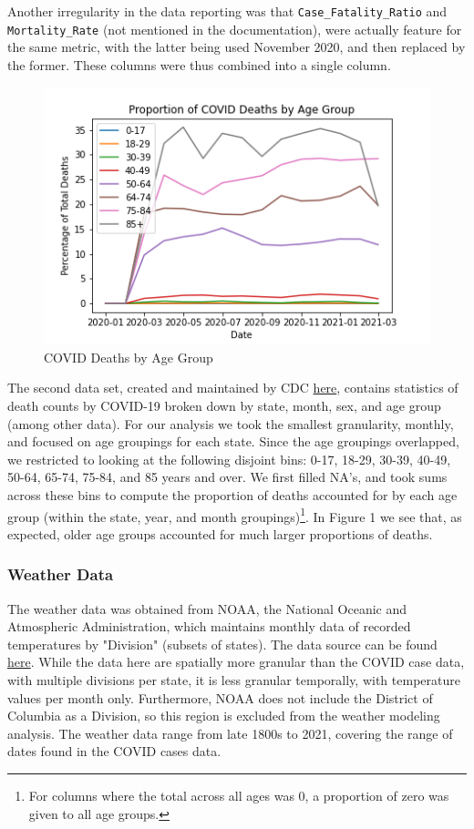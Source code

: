 \documentclass[11pt]{article}
\begin{document}
Another irregularity in the data reporting was that \texttt{Case\_Fatality\_Ratio} and \texttt{Mortality\_Rate} (not mentioned in the documentation), were actually feature for the same metric, with the latter being used November 2020, and then replaced by the former. These columns were thus combined into a single column.


\begin{figure}
\centering
\includegraphics[scale=0.55]{"../figures/death_proportions_by_age.png"}
\caption{COVID Deaths by Age Group}
\end{figure}
The second data set, created and maintained by CDC \href{https://data.cdc.gov/NCHS/Provisional-COVID-19-Deaths-by-Sex-and-Age/9bhg-hcku}{here}, contains statistics of death counts by COVID-19 broken down by state, month, sex, and age group (among other data). For our analysis we took the smallest granularity, monthly, and focused on age groupings for each state. Since the age groupings overlapped, we restricted to looking at the following disjoint bins:  0-17,  18-29, 30-39, 40-49, 50-64, 65-74, 75-84, and 85 years and over. We first filled NA's, and took sums across these bins to compute the proportion of deaths accounted for by each age group (within the state, year, and month groupings)\footnote{For columns where the total across all ages was 0, a proportion of zero was given to all age groups.}.  In Figure 1 we see that, as expected, older age groups accounted for much larger proportions of deaths. 




\newpage
\subsubsection{Weather Data}
The weather data was obtained from NOAA, the National Oceanic and Atmospheric Administration, which maintains monthly data of recorded temperatures by "Division" (subsets of states). The data source can be found \href{https://www.ncdc.noaa.gov/cag/divisional/mapping/110/tavg/202010/ytd/value}{here}. While the data here are spatially more granular than the COVID case data, with multiple divisions per state, it is less granular temporally, with temperature values per month only. Furthermore, NOAA does not include the District of Columbia as a Division, so this region is excluded from the weather modeling analysis. The weather data range from late 1800s to 2021, covering the range of dates found in the COVID cases data. 
\end{document}
